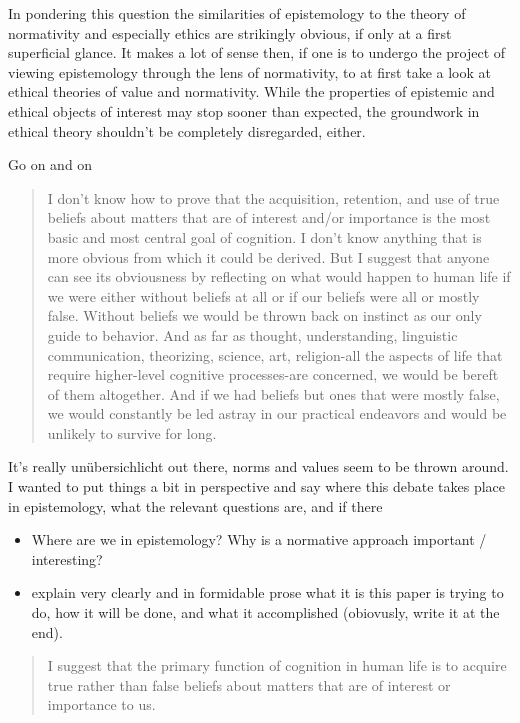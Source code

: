 \documentclass[12pt,numbers=noenddot]{scrartcl}
\begin{document}
In pondering this question the similarities of epistemology to the theory of normativity and especially ethics are strikingly obvious, if only at a first superficial glance. It makes a lot of sense then, if one is to undergo the project of viewing epistemology through the lens of normativity, to at first take a look at ethical theories of value and normativity. While the properties of epistemic and ethical objects of interest may stop sooner than expected, the groundwork in ethical theory shouldn't be completely disregarded, either.

Go on and on


\begin{quote}
I don't know how to prove that the acquisition, retention, and use of true beliefs about matters that are of interest and/or importance is the most basic and most central goal of cognition. I don't know anything that is more obvious from which it could be derived. But I suggest that anyone can see its obviousness by reflecting on what would happen to human life if we were either without beliefs at all or if our beliefs were all or mostly false. Without beliefs we would be thrown back on instinct as our only guide to behavior. And as far as thought, understanding, linguistic communication, theorizing, science, art, religion-all the aspects of life that require higher-level cognitive processes-are concerned, we would be bereft of them altogether. And if we had beliefs but ones that were mostly false, we would constantly be led astray in our practical endeavors and would be unlikely to survive for long. \textcite[30]{Alston2005-ALSBJD}
\end{quote}

It's really unübersichlicht out there, norms and values seem to be thrown around. I wanted to put things a bit in perspective and say where this debate takes place in epistemology, what the relevant questions are, and if there 
\begin{itemize}
    \item Where are we in epistemology? Why is a normative approach important / interesting?
    \item explain very clearly and in formidable prose what it is this paper is trying to do, how it will be done, and what it accomplished (obiovusly, write it at the end).
\end{itemize}

\begin{quote}
 I suggest that the primary function of cognition in human life is to acquire true rather than false beliefs about matters that are of interest or importance to us. \textcite[29]{Alston2005-ALSBJD}
\end{quote}
\end{document}
